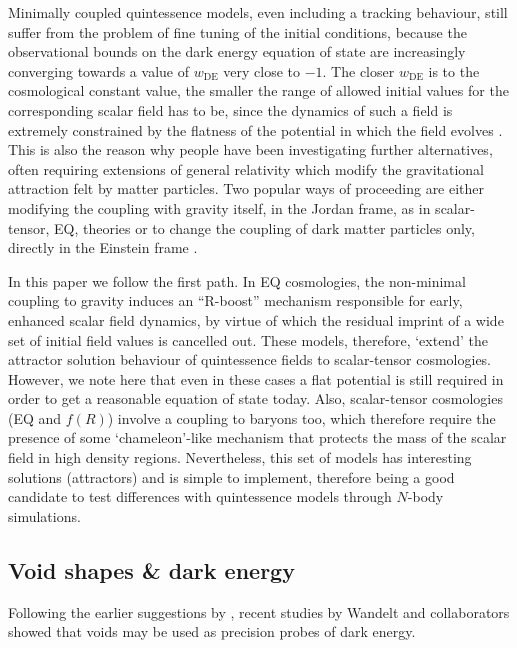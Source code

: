 Minimally coupled quintessence models, even including a tracking behaviour, still suffer from the problem of fine tuning of the initial conditions, 
because the observational bounds on the dark energy equation of state are increasingly converging towards a value of $w_\mathrm{DE}$ very close to $-1$. 
The closer $w_\mathrm{DE}$ is to the cosmological constant value, the smaller the range of allowed initial values for the corresponding scalar field 
has to be, since the dynamics of such a field is extremely constrained by the flatness of the potential in which the field evolves \citep{matarrese04, pettorino05b}. This is also the reason why people have been investigating further alternatives, often requiring extensions of general relativity
which modify the gravitational attraction felt by matter particles. Two popular ways of proceeding
are either modifying the coupling with gravity itself, in the Jordan frame, as in scalar-tensor,
EQ, theories or to change the coupling of dark matter particles only, directly in the Einstein frame 
\citep[and references therein]{amendola00, pettorino08}.

In this paper we follow the first path. In EQ cosmologies, the non-minimal coupling to gravity
induces an ``R-boost'' mechanism responsible for early, enhanced scalar field dynamics, by virtue
of which the residual imprint of a wide set of initial field values is cancelled out. These
models, therefore, `extend' the attractor solution behaviour of quintessence fields to scalar-tensor
cosmologies. However, we note here that even in these cases a flat potential is still
required in order to get a reasonable equation of state today. Also, scalar-tensor cosmologies (EQ
and $f(R)$) involve a coupling to baryons too, which therefore require the presence of some
`chameleon'-like mechanism that protects the mass of the scalar field in high density regions.
Nevertheless, this set of models has interesting solutions (attractors) and is simple to
implement, therefore being a good candidate to test differences with quintessence models through
$N$-body simulations.

\subsection{Void shapes \& dark energy}
\label{sec:voidDE}
Following the earlier suggestions by \citet{parklee07,leepark09}, recent studies by Wandelt and collaborators 
\citep{lavaux10,biswas10} showed that voids may be used as precision probes of dark energy. 

